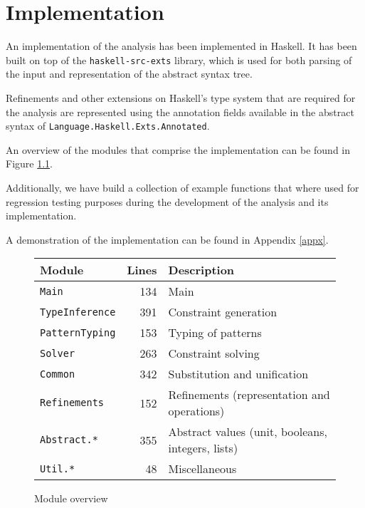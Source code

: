 \chapter{Implementation}\label{chapimplementation}

An implementation of the analysis has been implemented in Haskell. It has been built on top of the \texttt{haskell-src-exts} library, which is used for both parsing of the input and representation of the abstract syntax tree.

Refinements and other extensions on Haskell's type system that are required for the analysis are represented using the annotation fields available in the abstract syntax of \texttt{Language.Haskell.Exts.Annotated}.

An overview of the modules that comprise the implementation can be found in Figure \ref{moduleoverview}.

Additionally, we have build a collection of example functions that where used for regression testing purposes during the development of the analysis and its implementation.

A demonstration of the implementation can be found in Appendix \ref{appx}.

\vspace{5em}

\begin{figure}[h]
\centering
\begin{tabular}{lrl}
Module & Lines & Description \\
\hline
\texttt{Main}          &  134 & Main \\
\texttt{TypeInference} &  391 & Constraint generation \\
\texttt{PatternTyping} &  153 & Typing of patterns \\
\texttt{Solver}        &  263 & Constraint solving \\
\texttt{Common}        &  342 & Substitution and unification \\
\texttt{Refinements}   &  152 & Refinements (representation and operations) \\
\texttt{Abstract.*}    &  355 & Abstract values (unit, booleans, integers, lists)\\
\texttt{Util.*}        &   48 & Miscellaneous
\end{tabular}
\caption{Module overview}
\label{moduleoverview}
\end{figure}
